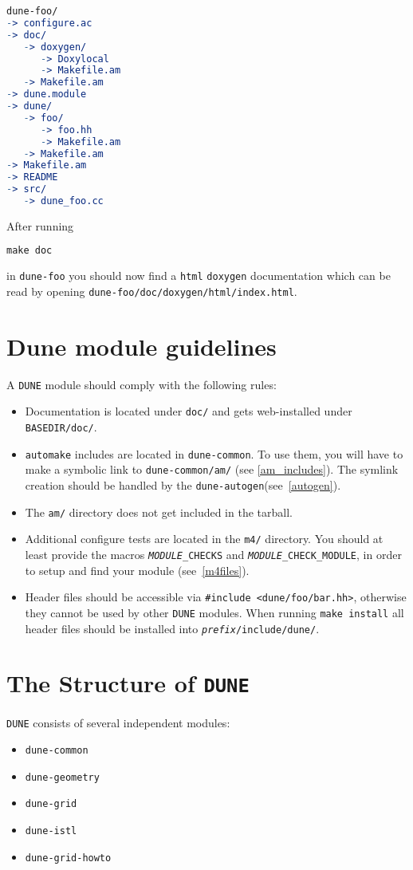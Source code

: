 \documentclass[11pt,a4paper,headinclude,footinclude,DIV16,normalheadings]{scrartcl}
\newcommand{\dune}{\texttt{DUNE}\xspace}
\newcommand{\automake}{\texttt{automake}\xspace}
\newcommand{\autogen}{\texttt{dune-autogen}\xspace}
\newcommand{\dunecommon}{\texttt{dune-common}\xspace}
\newcommand{\duneistl}{\texttt{dune-istl}\xspace}
\newcommand{\dunegeometry}{\texttt{dune-geometry}\xspace}
\newcommand{\dunegrid}{\texttt{dune-grid}\xspace}
\newcommand{\dunegridhowto}{\texttt{dune-grid-howto}\xspace}
\begin{document}
\begin{lstlisting}[language=make]
dune-foo/
-> configure.ac
-> doc/
   -> doxygen/
      -> Doxylocal
      -> Makefile.am
   -> Makefile.am
-> dune.module
-> dune/
   -> foo/
      -> foo.hh
      -> Makefile.am
   -> Makefile.am
-> Makefile.am
-> README
-> src/
   -> dune_foo.cc
\end{lstlisting}

After running
\begin{lstlisting}[language=make]
make doc
\end{lstlisting}
in \texttt{dune-foo} you should now find a
\texttt{html} \texttt{doxygen} documentation which can be read by opening
\texttt{dune-foo/doc/doxygen/html/index.html}.

\section{Dune module guidelines}\label{section::dune_module_guidelines}
\label{guidelines}

A \dune module should comply with the following rules:
\begin{itemize}
\item Documentation is located under \texttt{doc/} and gets
  web-installed under \texttt{BASEDIR/doc/}.
\item \automake includes are located in \dunecommon. To use them, you
  will have to make a symbolic link to \texttt{dune-common/am/} (see
  \ref{am_includes}). The symlink creation should be handled by the
  \autogen (see~\ref{autogen}).
\item The \texttt{am/} directory does not get included in the tarball.
\item Additional configure tests are located in the \texttt{m4/}
  directory. You should at least provide the macros \texttt{\emph{MODULE}\_CHECKS}
  and \texttt{\emph{MODULE}\_CHECK\_MODULE}, in order to setup and
  find your module (see~\ref{m4files}).
\item Header files should be accessible via \verb!#include <dune/foo/bar.hh>!,
  otherwise they cannot be used by other \dune modules.   When running
  \texttt{make install} all header files should be installed into
  \texttt{\textit{prefix}/include/dune/}.
\end{itemize}

\section{The Structure of \dune}
\dune consists of several independent modules:
\begin{itemize}
\item \dunecommon
\item \dunegeometry
\item \dunegrid
\item \duneistl
\item \dunegridhowto
\end{itemize}
\end{document}
